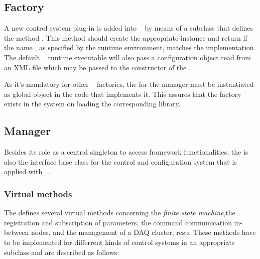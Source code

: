 \subsection{Factory}
 \label{prog_manager_controls_factory}
A new control system plug-in is added into \dabc~ 
by means of a  subclass that  
defines the method
.
This method should
create the appropriate  instance and return  
if the name , as specified by the runtime environment,
matches the implementation.
The default \dabc~ runtime executable will also pass 
a configuration object  read from an XML file which may be
passed to the constructor of the .

As it's mandatory for other \dabc~ factories, 
the  for the manager must be
instantiated as global object in the code that implements it.
This assures that the factory exists in the system on
loading the corresponding library.

\subsection{Manager}
\label{prog_manager_controls_manager}
Besides its role as a central singleton to access framework functionalities,
the  is also the interface base class for the 
control and configuration system that is applied with \dabc~. 

\subsubsection{Virtual methods}
The  defines several virtual methods concerning the {\em finite state machine},the registration and subscription of parameters, the command communication
in-between nodes, and the management of a DAQ cluster, resp.
These methods have to be implemented for differrent kinds of control systems in
an appropriate subclass and are described as follows:

